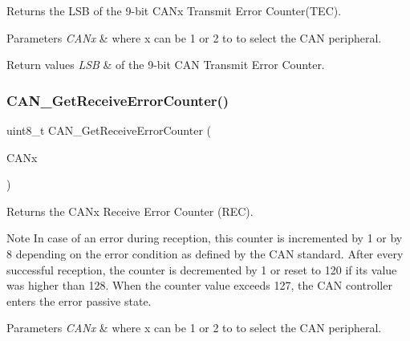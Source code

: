 Returns the L\+SB of the 9-\/bit C\+A\+Nx Transmit Error Counter(\+T\+E\+C). 


\begin{DoxyParams}{Parameters}
{\em C\+A\+Nx} & where x can be 1 or 2 to to select the C\+AN peripheral.\\
\hline
\end{DoxyParams}

\begin{DoxyRetVals}{Return values}
{\em L\+SB} & of the 9-\/bit C\+AN Transmit Error Counter. \\
\hline
\end{DoxyRetVals}
\mbox{\label{group___c_a_n___exported___functions_ga6903eecbec40eb1361d915ddde9a3274}} 
\subsubsection{\texorpdfstring{CAN\_GetReceiveErrorCounter()}{CAN\_GetReceiveErrorCounter()}}
{\footnotesize\ttfamily uint8\+\_\+t C\+A\+N\+\_\+\+Get\+Receive\+Error\+Counter (\begin{DoxyParamCaption}\item[{\mbox{\hyperlink{struct_c_a_n___type_def}{C\+A\+N\+\_\+\+Type\+Def}} $\ast$}]{C\+A\+Nx }\end{DoxyParamCaption})}



Returns the C\+A\+Nx Receive Error Counter (R\+EC). 

\begin{DoxyNote}{Note}
In case of an error during reception, this counter is incremented by 1 or by 8 depending on the error condition as defined by the C\+AN standard. After every successful reception, the counter is decremented by 1 or reset to 120 if its value was higher than 128. When the counter value exceeds 127, the C\+AN controller enters the error passive state.
\end{DoxyNote}

\begin{DoxyParams}{Parameters}
{\em C\+A\+Nx} & where x can be 1 or 2 to to select the C\+AN peripheral.\\
\hline
\end{DoxyParams}

